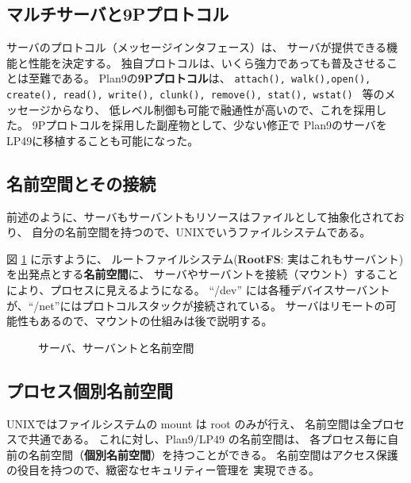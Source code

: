 \documentclass[draft]{ipsjpapers}
\begin{document}
\subsection{マルチサーバと9Pプロトコル}

  サーバのプロトコル（メッセージインタフェース）は、
  サーバが提供できる機能と性能を決定する。
  独自プロトコルは、いくら強力であっても普及させることは至難である。
  Plan9の{\bf 9Pプロトコル}は、
  {\tt attach(), walk(),open(), create(), 
  read(), write(), clunk(), remove(), stat(), wstat() }
  等のメッセージからなり、
  低レベル制御も可能で融通性が高いので、これを採用した。
  9Pプロトコルを採用した副産物として、少ない修正で
  Plan9のサーバをLP49に移植することも可能になった。


\subsection{名前空間とその接続}

  前述のように、サーバもサーバントもリソースはファイルとして抽象化されており、
自分の名前空間を持つので、UNIXでいうファイルシステムである。

図 \ref{fig:NS-server-servant} に示すように、
ルートファイルシステム({\bf RootFS}: 実はこれもサーバント)を出発点とする{\bf 名前空間}に、
サーバやサーバントを接続（マウント）することにより、プロセスに見えるようになる。
``/dev'' には各種デバイスサーバントが、``/net''にはプロトコルスタックが接続されている。
サーバはリモートの可能性もあるので、マウントの仕組みは後で説明する。

\begin{figure}[htb]
  \begin{center}
   \epsfxsize=400pt
    \caption{サーバ、サーバントと名前空間}
    \label{fig:NS-server-servant}
  \end{center}
\end{figure}



\subsection{プロセス個別名前空間}

  UNIXではファイルシステムの mount は root のみが行え、
  名前空間は全プロセスで共通である。
  これに対し、Plan9/LP49 の名前空間は、
  各プロセス毎に自前の名前空間（{\bf 個別名前空間}）を持つことができる。
  名前空間はアクセス保護の役目を持つので、緻密なセキュリティー管理を
  実現できる。
\end{document}
